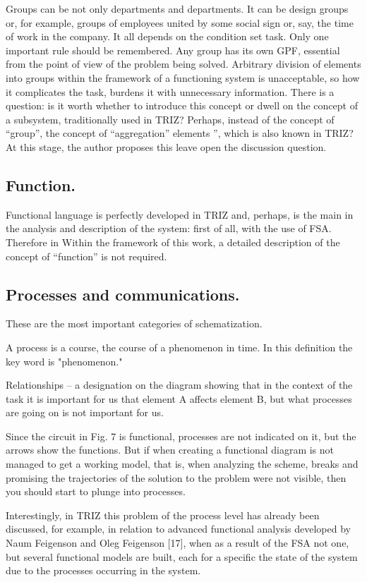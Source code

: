 Groups can be not only departments and departments. It can be design groups
or, for example, groups of employees united by some social sign or, say, the
time of work in the company. It all depends on the condition set task. Only
one important rule should be remembered. Any group has its own GPF, essential
from the point of view of the problem being solved. Arbitrary division of
elements into groups within the framework of a functioning system is
unacceptable, so how it complicates the task, burdens it with unnecessary
information. There is a question: is it worth whether to introduce this
concept or dwell on the concept of a subsystem, traditionally used in TRIZ?
Perhaps, instead of the concept of “group”, the concept of “aggregation”
elements ”, which is also known in TRIZ? At this stage, the author proposes
this leave open the discussion question.

\subsection*{Function.}
Functional language is perfectly developed in TRIZ and, perhaps, is the main
in the analysis and description of the system: first of all, with the use of
FSA. Therefore in Within the framework of this work, a detailed description of
the concept of “function” is not required.

\subsection*{Processes and communications.}
These are the most important categories of schematization.

A process is a course, the course of a phenomenon in time. In this definition
the key word is "phenomenon."

Relationships -- a designation on the diagram showing that in the context of
the task it is important for us that element A affects element B, but what
processes are going on is not important for us.

Since the circuit in Fig. 7 is functional, processes are not indicated on it,
but the arrows show the functions. But if when creating a functional diagram
is not managed to get a working model, that is, when analyzing the scheme,
breaks and promising the trajectories of the solution to the problem were not
visible, then you should start to plunge into processes.

Interestingly, in TRIZ this problem of the process level has already been
discussed, for example, in relation to advanced functional analysis developed
by Naum Feigenson and Oleg Feigenson [17], when as a result of the FSA not
one, but several functional models are built, each for a specific the state of
the system due to the processes occurring in the system.

